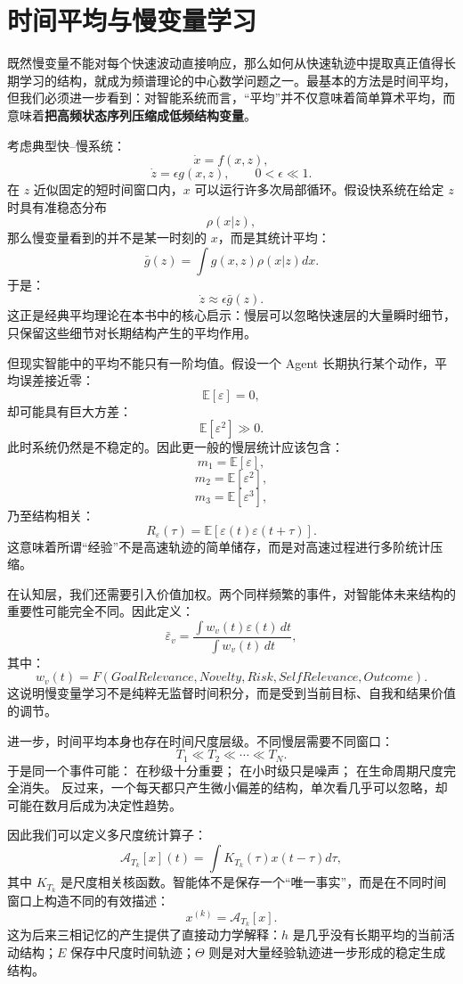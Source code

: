 \section{时间平均与慢变量学习}

既然慢变量不能对每个快速波动直接响应，那么如何从快速轨迹中提取真正值得长期学习的结构，就成为频谱理论的中心数学问题之一。最基本的方法是时间平均，但我们必须进一步看到：对智能系统而言，“平均”并不仅意味着简单算术平均，而意味着\textbf{把高频状态序列压缩成低频结构变量}。

考虑典型快--慢系统：
\[
\dot{x}
=
f(x,z),
\]
\[
\dot{z}
=
\epsilon g(x,z),
\qquad
0<\epsilon\ll1.
\]
在 $z$ 近似固定的短时间窗口内，$x$ 可以运行许多次局部循环。假设快系统在给定 $z$ 时具有准稳态分布
\[
\rho(x|z),
\]
那么慢变量看到的并不是某一时刻的 $x$，而是其统计平均：
\[
\bar{g}(z)
=
\int
g(x,z)
\rho(x|z)
dx.
\]
于是：
\[
\dot{z}
\approx
\epsilon
\bar{g}(z).
\]
这正是经典平均理论在本书中的核心启示：慢层可以忽略快速层的大量瞬时细节，只保留这些细节对长期结构产生的平均作用。

但现实智能中的平均不能只有一阶均值。假设一个 Agent 长期执行某个动作，平均误差接近零：
\[
\mathbb{E}[\varepsilon]=0,
\]
却可能具有巨大方差：
\[
\mathbb{E}[\varepsilon^2]\gg0.
\]
此时系统仍然是不稳定的。因此更一般的慢层统计应该包含：
\[
m_1
=
\mathbb{E}[\varepsilon],
\]
\[
m_2
=
\mathbb{E}[\varepsilon^2],
\]
\[
m_3
=
\mathbb{E}[\varepsilon^3],
\]
乃至结构相关：
\[
R_\varepsilon(\tau)
=
\mathbb{E}
[
\varepsilon(t)
\varepsilon(t+\tau)
].
\]
这意味着所谓“经验”不是高速轨迹的简单储存，而是对高速过程进行多阶统计压缩。

在认知层，我们还需要引入价值加权。两个同样频繁的事件，对智能体未来结构的重要性可能完全不同。因此定义：
\[
\bar{\varepsilon}_{v}
=
\frac{
\int
w_v(t)
\varepsilon(t)\,dt
}{
\int
w_v(t)\,dt
},
\]
其中：
\[
w_v(t)
=
F
\left(
GoalRelevance,
Novelty,
Risk,
SelfRelevance,
Outcome
\right).
\]
这说明慢变量学习不是纯粹无监督时间积分，而是受到当前目标、自我和结果价值的调节。

进一步，时间平均本身也存在时间尺度层级。不同慢层需要不同窗口：
\[
T_1
\ll
T_2
\ll
\cdots
\ll
T_N.
\]
于是同一个事件可能：
在秒级十分重要；
在小时级只是噪声；
在生命周期尺度完全消失。
反过来，一个每天都只产生微小偏差的结构，单次看几乎可以忽略，却可能在数月后成为决定性趋势。

因此我们可以定义多尺度统计算子：
\[
\mathcal{A}_{T_k}
[x](t)
=
\int
K_{T_k}(\tau)
x(t-\tau)
d\tau,
\]
其中 $K_{T_k}$ 是尺度相关核函数。智能体不是保存一个“唯一事实”，而是在不同时间窗口上构造不同的有效描述：
\[
x^{(k)}
=
\mathcal{A}_{T_k}[x].
\]
这为后来三相记忆的产生提供了直接动力学解释：$h$ 是几乎没有长期平均的当前活动结构；$E$ 保存中尺度时间轨迹；$\Theta$ 则是对大量经验轨迹进一步形成的稳定生成结构。

